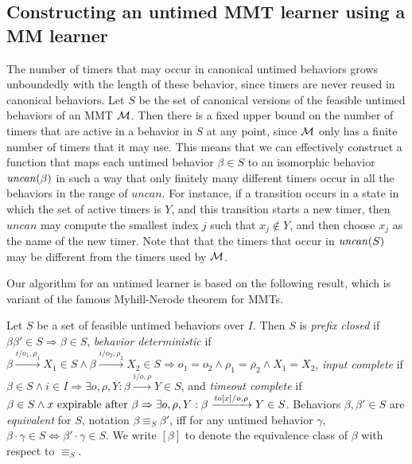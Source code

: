 \subsection{Constructing an untimed MMT learner using a MM learner}
The number of timers that may occur in canonical untimed behaviors grows unboundedly with the length of these behavior,
since timers are never reused in canonical behaviors.
Let $S$ be the set of canonical versions of the feasible untimed behaviors of an MMT ${\cal M}$.
Then there is a fixed upper bound on the number of timers that are active in a behavior in $S$ at any point,
since ${\cal M}$ only has a finite number of timers that it may use.
This means that we can effectively construct a function that maps each untimed behavior $\beta \in S$
to an isomorphic behavior $\mathit{uncan}({\beta})$ in such a way that only finitely many
different timers occur in all the behaviors in the range of $\mathit{uncan}$.
For instance, if a transition occurs in a state in which the set of active timers is $Y$, and this transition
starts a new timer, then $\mathit{uncan}$ may compute the smallest index $j$
such that $x_j \not\in Y$, and then choose $x_j$ as the name of the new timer.
Note that that the timers that occur in $\mathit{uncan}({S})$ may be different from the timers used by ${\cal M}$.

Our algorithm for an untimed learner is based on the following result, which is variant of the famous 
Myhill-Nerode theorem for MMTs.

\begin{definition}
Let $S$ be a set of feasible untimed behaviors over $I$. Then $S$ is
\emph{prefix closed} if $\beta \beta' \in S \Rightarrow \beta \in S$,
\emph{behavior deterministic} if
$\beta \xrightarrow{i/o_1, \rho_1} X_1 \in S \wedge \beta \xrightarrow{i/o_2, \rho_2} X_2 \in S \Rightarrow o_1 = o_2 \wedge \rho_1 = \rho_2 \wedge X_1 = X_2$,
\emph{input complete} if
$\beta \in S \wedge i \in I \Rightarrow \exists o, \rho, Y : \beta \xrightarrow{i/o, \rho} Y \in S$,
and
\emph{timeout complete} if
$\beta \in S \wedge x \mbox{ expirable after } \beta \Rightarrow
\exists o, \rho, Y: \beta \xrightarrow{\mathit{to}[x]/o, \rho} Y \in S$.
Behaviors $\beta, \beta' \in S$ are \emph{equivalent} for $S$, notation $\beta \equiv_S \beta'$, iff 
for any untimed behavior
$\gamma$, $\beta \cdot \gamma \in S \Leftrightarrow \beta' \cdot \gamma \in S$.
We write $[\beta]$ to denote the equivalence class of $\beta$ with respect to $\equiv_S$.
\end{definition}

